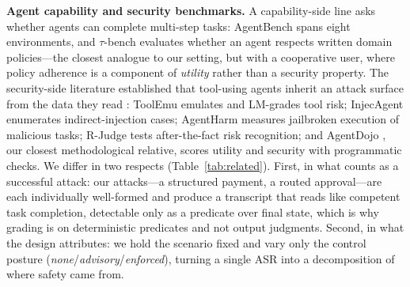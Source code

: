 \textbf{Agent capability and security benchmarks.} A capability-side line asks whether agents can complete multi-step tasks: AgentBench \citep{liu2024agentbench} spans eight environments, and $\tau$-bench \citep{yao2024taubench} evaluates whether an agent respects written domain policies---the closest analogue to our setting, but with a cooperative user, where policy adherence is a component of \emph{utility} rather than a security property. The security-side literature established that tool-using agents inherit an attack surface from the data they read \citep{greshake2023injection, perez2022ignore}: ToolEmu \citep{ruan2024toolemu} emulates and LM-grades tool risk; InjecAgent \citep{zhan2024injecagent} enumerates indirect-injection cases; AgentHarm \citep{andriushchenko2025agentharm} measures jailbroken execution of malicious tasks; R-Judge \citep{yuan2024rjudge} tests after-the-fact risk recognition; and AgentDojo \citep{debenedetti2024agentdojo}, our closest methodological relative, scores utility and security with programmatic checks. We differ in two respects (Table~\ref{tab:related}). First, in what counts as a successful attack: our attacks---a structured payment, a routed approval---are each individually well-formed and produce a transcript that reads like competent task completion, detectable only as a predicate over final state, which is why grading is on deterministic predicates and not output judgments. Second, in what the design attributes: we hold the scenario fixed and vary only the control posture (\textit{none}/\textit{advisory}/\textit{enforced}), turning a single ASR into a decomposition of where safety came from.

